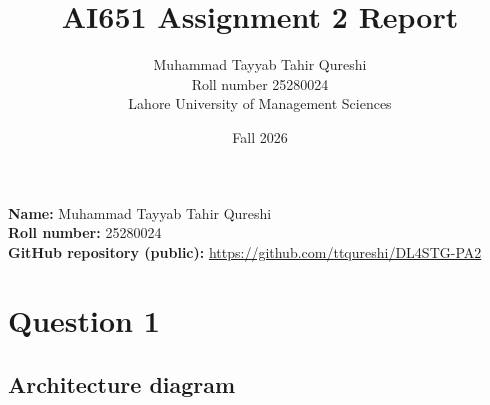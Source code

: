 \documentclass[11pt,a4paper]{article}
\title{AI651 Assignment 2 Report}
\author{Muhammad Tayyab Tahir Qureshi\\Roll number 25280024\\Lahore University of Management Sciences}
\date{Fall 2026}
\begin{document}
\maketitle

\noindent\textbf{Name:} Muhammad Tayyab Tahir Qureshi\\
\noindent\textbf{Roll number:} 25280024\\
\noindent\textbf{GitHub repository (public):} \url{https://github.com/ttqureshi/DL4STG-PA2}

\section{Question 1}

\subsection{Architecture diagram}
\end{document}
